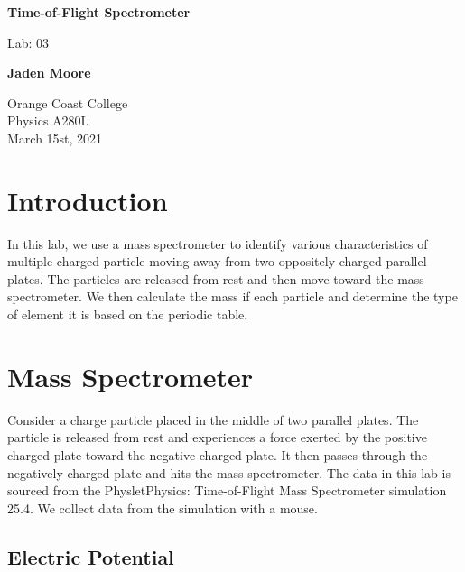 \documentclass[12pt]{article}
\begin{document}

\begin{titlepage}
    \begin{center}
        \vspace*{1cm}
        \textbf{Time-of-Flight Spectrometer}

        \vspace{0.5cm}
        Lab: 03

        \vspace{1cm}

        \textbf{Jaden Moore}

        \vfill

        Orange Coast College\\
        Physics A280L\\
        March 15st, 2021

    \end{center}
\end{titlepage}

\pagestyle{fancy}
\fancyhf{}
\setlength{\headheight}{15pt}
\cfoot{\thepage}

\section{Introduction}
In this lab, we use a mass spectrometer to identify various characteristics of multiple charged particle moving away from two oppositely charged parallel plates. The particles are released from rest and then move toward the mass spectrometer. We then calculate the mass if each particle and determine the type of element it is based on the periodic table.

\section{Mass Spectrometer}
Consider a charge particle placed in the middle of two parallel plates. The particle is released from rest and experiences a force exerted by the positive charged plate toward the negative charged plate. It then passes through the negatively charged plate and hits the mass spectrometer. The data in this lab is sourced from the Physlet\textregistered \space Physics: Time-of-Flight Mass Spectrometer simulation 25.4. We collect data from the simulation with a mouse.
\subsection{Electric Potential}
\end{document}
